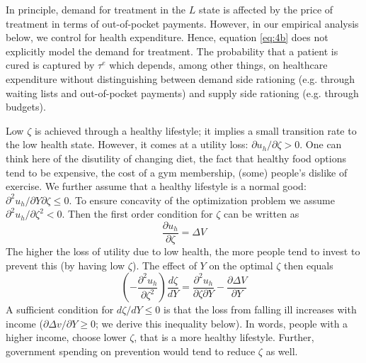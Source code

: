 \documentclass{article}
\begin{document}
In principle, demand for treatment in the \(L\) state is affected by the price of treatment in terms of out-of-pocket payments. However, in our empirical analysis below, we control for health expenditure. Hence, equation \eqref{eq:4b} does not explicitly model the demand for treatment. The probability that a patient is cured is captured by \(\tau^e\) which depends, among other things, on healthcare expenditure without distinguishing between demand side rationing (e.g. through waiting lists and out-of-pocket payments) and supply side rationing (e.g. through budgets).

Low \(\zeta\) is achieved through a healthy lifestyle; it implies a small transition rate to the low health state. However, it comes at a utility loss: \(\partial u_h/ \partial \zeta > 0\). One can think here of the disutility of changing diet, the fact that healthy food options tend to be expensive, the cost of a gym membership, (some) people's dislike of exercise. We further assume that a healthy lifestyle is a normal good: \(\partial^2 u_h/ \partial Y \partial \zeta  \leq 0\). To ensure concavity of the optimization problem we assume \(\partial^2 u_h / \partial \zeta^2 <0\). Then the first order condition for \(\zeta\) can be written as
\begin{equation}
\label{eq:5}
\frac{\partial u_h}{\partial \zeta} = \Delta V
\end{equation}
The higher the loss of utility due to low health, the more people tend to invest to prevent this (by having low \(\zeta\)). The effect of \(Y\) on the optimal \(\zeta\) then equals
\begin{equation}
\label{eq:6}
\left(- \frac{\partial^2 u_h}{\partial \zeta^2}\right) \frac{d\zeta}{dY} = \frac{\partial^2 u_h}{\partial \zeta \partial Y} - \frac{\partial \Delta V}{\partial Y} 
\end{equation}
A sufficient condition for \(d\zeta/dY \leq 0\) is that the loss from falling ill increases with income (\(\partial \Delta v/\partial Y \geq 0\); we derive this inequality below). In words, people with a higher income, choose lower \(\zeta\), that is a more healthy lifestyle. Further, government spending on prevention would tend to reduce \(\zeta\) as well.
\end{document}
